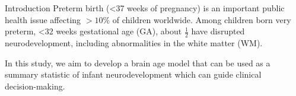 \documentclass[final]{beamer}
\newlength{\sepwidth}
\newlength{\colwidth}
\newcommand{\separatorcolumn}{\begin{column}{\sepwidth}\end{column}}
\begin{document}
\begin{frame}[t]
\begin{columns}[t]
\separatorcolumn

\begin{column}{\colwidth}
  \vspace{-15pt}
  \begin{block}{Introduction}
    Preterm birth (\textless 37 weeks of pregnancy) is an important public health issue affecting $>10\%$ of children worldwide. Among children born very preterm, \textless 32 weeks gestational age (GA), about $\frac{1}{2}$ have disrupted neurodevelopment, including abnormalities in the white matter (WM).
    
     In this study, we aim to develop a brain age model that can be used as a summary statistic of infant neurodevelopment which can guide clinical decision-making.

    \begin{columns}[t] %
      \begin{column}{0.45\textwidth}
        \vspace{5pt}
      \end{column}
    
      \begin{column}{0.5\textwidth}
        \vspace{-20pt} %
        \begin{tcolorbox}[colback=blue!10!white, colframe=blue!40!black, width=\linewidth]
          {}
        \end{tcolorbox}
      \end{column}
    \end{columns}
  \end{block}


\end{column}
\end{columns}
\end{frame}
\end{document}
